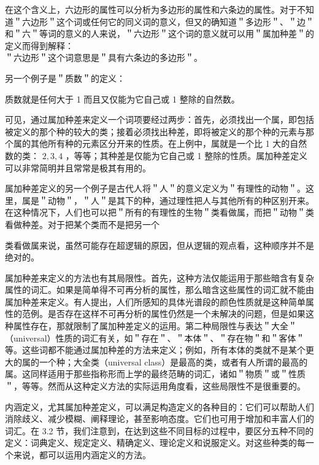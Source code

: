 在这个含义上，六边形的属性可以分析为多边形的属性和六条边的属性。对于不知道＂六边形＂这个词或任何它的同义词的意义，但又的确知道＂多边形＂、＂边＂和＂六＂等词的意义的人来说，＂六边形＂这个词的意义就可以用＂属加种差＂的定义而得到解释：\\
＂六边形＂这个词意思是＂具有六条边的多边形＂。

另一个例子是＂质数＂的定义：

质数就是任何大于 1 而且又仅能为它自己或 1 整除的自然数。

可见，通过属加种差来定义一个词项要经过两步：首先，必须找出一个属，即包括被定义的那个种的较大的类；接着必须找出种差，即将被定义的那个种的元素与那个属的其他所有种的元素区分开来的性质。在上例中，属就是一个比 1 大的自然数的类： $2,3,4$ ，等等；其种差是仅能为它自己或 1 整除的性质。属加种差定义可以非常简明并且常常是极其有用的。

属加种差定义的另一个例子是古代人将＂人＂的意义定义为＂有理性的动物＂。这里，属是＂动物＂，＂人＂是其下的种，通过理性把人与其他所有的种区别开来。在这种情况下，人们也可以把＂所有的有理性的生物＂类看做属，而把＂动物＂类看做种差。对于把某个类而不是把另一个

类看做属来说，虽然可能存在超逻辑的原因，但从逻辑的观点看，这种顺序并不是绝对的。

属加种差来定义的方法也有其局限性。首先，这种方法仅能运用于那些暗含有复杂属性的词汇。如果是简单得不可再分析的属性，那么暗含这些属性的词汇就不能由属加种差来定义。有人提出，人们所感知的具体光谱段的颜色性质就是这种简单属性的范例。是否存在这样不可再分析的属性仍然是一个未解决的问题，但是如果这种属性存在，那就限制了属加种差定义的运用。第二种局限性与表达＂大全＂（universal）性质的词汇有关，如＂存在＂、＂本体＂、＂存在物＂和＂客体＂等。这些词都不能通过属加种差的方法来定义；例如，所有本体的类就不是某个更大的属的一个种；大全类（universal class）是最高的类，或者有人所谓的最高的属。这同样适用于那些指称形而上学的最终范畴的词汇，诸如＂物质＂或＂性质＂，等等。然而从这种定义方法的实际运用角度看，这些局限性不是很重要的。

内涵定义，尤其属加种差定义，可以满足构造定义的各种目的：它们可以帮助人们消除歧义、减少模糊、阐释理论，甚至影响态度。它们也可用于增加和丰富人们的词汇。在 3.2 节，我们注意到，在达到这些不同目标的过程中，要区分五种不同的定义：词典定义、规定定义、精确定义、理论定义和说服定义。对这些种类的每一个来说，都可以运用内涵定义的方法。

